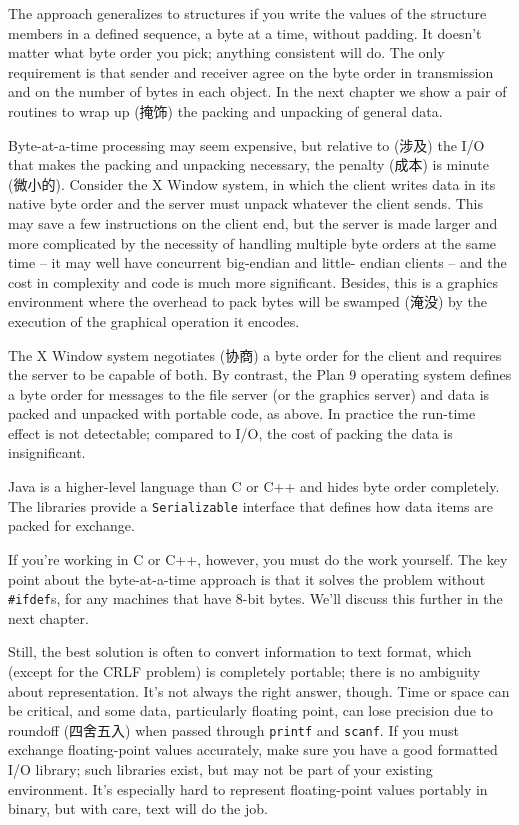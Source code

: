 The approach generalizes to structures if you write the values of the
structure members in a defined sequence, a byte at a time, without padding.
It doesn't matter what byte order you pick; anything consistent will do.
The only requirement is that sender and receiver agree on the byte order in
transmission and on the number of bytes in each object. In the next chapter
we show a pair of routines to wrap up (掩饰) the packing and unpacking of
general data.

Byte-at-a-time processing may seem expensive, but relative to (涉及) the
I/O that makes the packing and unpacking necessary, the penalty (成本) is
minute (微小的). Consider the X Window system, in which the client writes
data in its native byte order and the server must unpack whatever the
client sends.  This may save a few instructions on the client end, but the
server is made larger and more complicated by the necessity of handling
multiple byte orders at the same time -- it may well have concurrent
big-endian and little- endian clients -- and the cost in complexity and
code is much more significant.  Besides, this is a graphics environment
where the overhead to pack bytes will be swamped (淹没) by the execution of
the graphical operation it encodes.

The X Window system negotiates (协商) a byte order for the client and
requires the server to be capable of both. By contrast, the Plan 9
operating system defines a byte order for messages to the file server (or
the graphics server) and data is packed and unpacked with portable code, as
above. In practice the run-time effect is not detectable; compared to I/O,
the cost of packing the data is insignificant.

Java is a higher-level language than C or C++ and hides byte order
completely.  The libraries provide a \verb'Serializable' interface that
defines how data items are packed for exchange.

If you're working in C or C++, however, you must do the work yourself. The
key point about the byte-at-a-time approach is that it solves the problem
without \verb'#ifdef's, for any machines that have 8-bit bytes. We'll
discuss this further in the next chapter.

Still, the best solution is often to convert information to text format,
which (except for the CRLF problem) is completely portable; there is no
ambiguity about representation. It's not always the right answer, though.
Time or space can be critical, and some data, particularly floating point,
can lose precision due to roundoff (四舍五入) when passed through
\verb'printf' and \verb'scanf'. If you must exchange floating-point values
accurately, make sure you have a good formatted I/O library; such libraries
exist, but may not be part of your existing environment. It's especially
hard to represent floating-point values portably in binary, but with care,
text will do the job.

